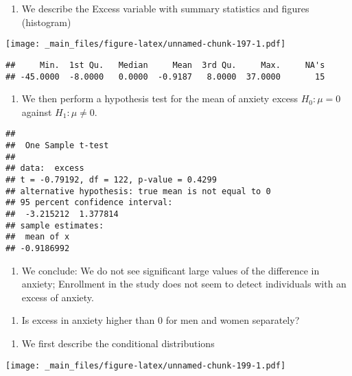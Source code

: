 \documentclass[
]{book}
\providecommand{\tightlist}{%
  \setlength{\itemsep}{0pt}\setlength{\parskip}{0pt}}
\begin{document}
\begin{enumerate}
\def\labelenumi{\alph{enumi}.}
\tightlist
\item
  We describe the Excess variable with summary statistics and figures (histogram)
\end{enumerate}

\texttt{[image: \_main\_files/figure-latex/unnamed-chunk-197-1.pdf]}

\begin{verbatim}
##     Min.  1st Qu.   Median     Mean  3rd Qu.     Max.     NA's 
## -45.0000  -8.0000   0.0000  -0.9187   8.0000  37.0000       15
\end{verbatim}

\begin{enumerate}
\def\labelenumi{\alph{enumi}.}
\setcounter{enumi}{1}
\tightlist
\item
  We then perform a hypothesis test for the mean of anxiety excess \(H_0:\mu=0\) against \(H_1:\mu \neq 0\).
\end{enumerate}

\begin{verbatim}
## 
##  One Sample t-test
## 
## data:  excess
## t = -0.79192, df = 122, p-value = 0.4299
## alternative hypothesis: true mean is not equal to 0
## 95 percent confidence interval:
##  -3.215212  1.377814
## sample estimates:
##  mean of x 
## -0.9186992
\end{verbatim}

\begin{enumerate}
\def\labelenumi{\alph{enumi}.}
\setcounter{enumi}{2}
\tightlist
\item
  We conclude: We do not see significant large values of the difference in anxiety; Enrollment in the study does not seem to detect individuals with an excess of anxiety.
\end{enumerate}

\begin{enumerate}
\def\labelenumi{\arabic{enumi}.}
\setcounter{enumi}{1}
\tightlist
\item
  Is excess in anxiety higher than \(0\) for men and women separately?
\end{enumerate}

\begin{enumerate}
\def\labelenumi{\alph{enumi}.}
\tightlist
\item
  We first describe the conditional distributions
\end{enumerate}

\texttt{[image: \_main\_files/figure-latex/unnamed-chunk-199-1.pdf]}
\end{document}

